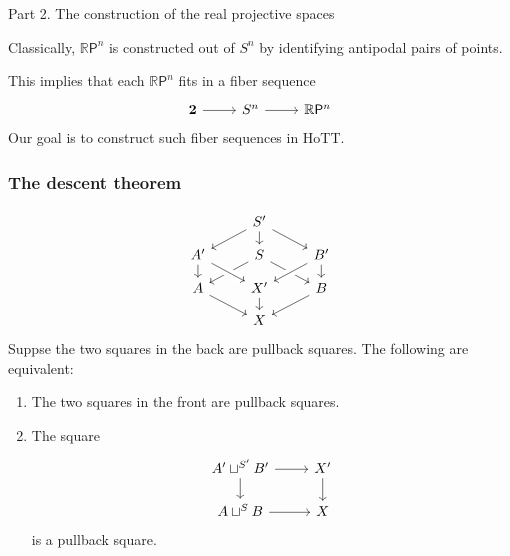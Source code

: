 \documentclass[handout]{beamer}
\newcommand{\sphere}[1]{S^{#1}}
\newcommand{\bool}{\mathbf{2}}
\newcommand{\RP}[1]{\mathbb{R}\mathsf{P}^{#1}}
\begin{document}
\begin{frame}
  \huge{Part 2. The construction of the real projective spaces}
\end{frame}

\begin{frame}
  Classically, $\RP{n}$ is constructed out of $\sphere{n}$ by identifying antipodal pairs of points.\\[\baselineskip]\pause

  This implies that each $\RP{n}$ fits in a fiber sequence
  \begin{equation*}
    \begin{tikzcd}[ampersand replacement=\&]
      \bool \arrow[r] \& \sphere{n} \arrow[r] \& \RP{n}
    \end{tikzcd}
  \end{equation*}
  Our goal is to construct such fiber sequences in HoTT.
\end{frame}

\begin{frame}
  \frametitle{The descent theorem}
  \begin{equation*}
    \begin{tikzcd}[ampersand replacement=\&,row sep=small]
      \& S' \arrow[dl] \arrow[dr] \arrow[d] \\
      A' \arrow[d] \& S \arrow[dl] \arrow[dr] \& B' \arrow[dl,crossing over] \arrow[d] \\
      A \arrow[dr] \& X' \arrow[from=ul,crossing over] \arrow[d] \& B \arrow[dl] \\
      \& X
    \end{tikzcd}
  \end{equation*}
  Suppse the two squares in the back are pullback squares. The following are equivalent:
  \begin{enumerate}
  \item The two squares in the front are pullback squares.
  \item The square
    \begin{equation*}
      \begin{tikzcd}[ampersand replacement=\&,row sep=1.5em]
        A'\sqcup^{S'}B' \arrow[r] \arrow[d] \& X' \arrow[d] \\
        A\sqcup^{S}B \arrow[r] \& X
      \end{tikzcd}
    \end{equation*}
    is a pullback square.
  \end{enumerate}
\end{frame}
\end{document}
